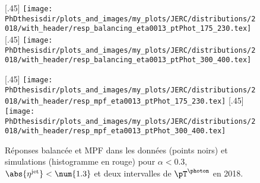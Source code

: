 \begin{figure}[h]
\centering
\subcaptionbox{Réponse balancée pour $\pT^{\photon}\in[175, 230[$ \SI{}{\GeV}.\label{subfig-distrib_Gjets_18_resp_balancing_eta0013_ptPhot_175_230}}[.45\textwidth]
{\texttt{[image: \\PhDthesisdir/plots\_and\_images/my\_plots/JERC/distributions/2018/with\_header/resp\_balancing\_eta0013\_ptPhot\_175\_230.tex]}}
\hfill
\subcaptionbox{Réponse balancée pour $\pT^{\photon}\in[300, 400[$ \SI{}{\GeV}.\label{subfig-distrib_Gjets_18_resp_balancing_eta0013_ptPhot_300_400}}[.45\textwidth]
{\texttt{[image: \\PhDthesisdir/plots\_and\_images/my\_plots/JERC/distributions/2018/with\_header/resp\_balancing\_eta0013\_ptPhot\_300\_400.tex]}}

\vspace{.5\baselineskip}

\subcaptionbox{Réponse MPF pour $\pT^{\photon}\in[175, 230[$ \SI{}{\GeV}.\label{subfig-distrib_Gjets_18_resp_mpf_eta0013_ptPhot_175_230}}[.45\textwidth]
{\texttt{[image: \\PhDthesisdir/plots\_and\_images/my\_plots/JERC/distributions/2018/with\_header/resp\_mpf\_eta0013\_ptPhot\_175\_230.tex]}}
\hfill
\subcaptionbox{Réponse MPF pour $\pT^{\photon}\in[300, 400[$ \SI{}{\GeV}.\label{subfig-distrib_Gjets_18_resp_mpf_eta0013_ptPhot_300_400}}[.45\textwidth]
{\texttt{[image: \\PhDthesisdir/plots\_and\_images/my\_plots/JERC/distributions/2018/with\_header/resp\_mpf\_eta0013\_ptPhot\_300\_400.tex]}}

\caption[Réponses balancée et MPF en 2018.]{Réponses balancée et MPF dans les données (points noirs) et simulations (histogramme en rouge) pour $\alpha<\num{0.3}$, $\abs{\eta^\text{jet}}<\num{1.3}$ et deux intervalles de $\pT^{\photon}$ en 2018.}
\label{fig-distribs_Gjets_18_resp_bal_and_mpf}
\end{figure}
